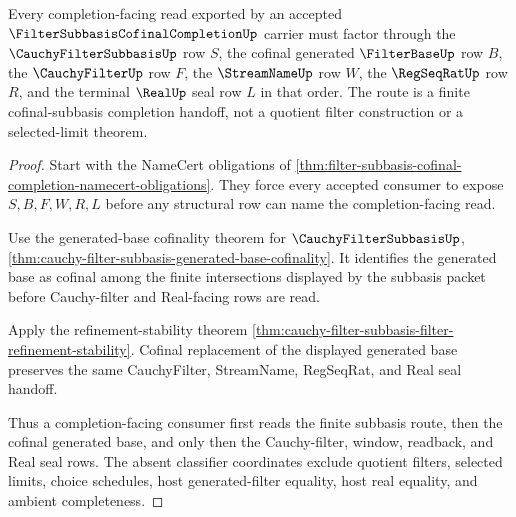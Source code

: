 \begin{theorem}
\label{thm:filter-subbasis-cofinal-completion-route}
Every completion-facing read exported by an accepted $\FilterSubbasisCofinalCompletionUp$ carrier must factor through the $\CauchyFilterSubbasisUp$ row $S$, the cofinal generated $\FilterBaseUp$ row $B$, the $\CauchyFilterUp$ row $F$, the $\StreamNameUp$ row $W$, the $\RegSeqRatUp$ row $R$, and the terminal $\RealUp$ seal row $L$ in that order. The route is a finite cofinal-subbasis completion handoff, not a quotient filter construction or a selected-limit theorem.
\end{theorem}
\begin{proof}
Start with the NameCert obligations of \autoref{thm:filter-subbasis-cofinal-completion-namecert-obligations}. They force every accepted consumer to expose $S,B,F,W,R,L$ before any structural row can name the completion-facing read.

Use the generated-base cofinality theorem for $\CauchyFilterSubbasisUp$, \autoref{thm:cauchy-filter-subbasis-generated-base-cofinality}. It identifies the generated base as cofinal among the finite intersections displayed by the subbasis packet before Cauchy-filter and Real-facing rows are read.

Apply the refinement-stability theorem \autoref{thm:cauchy-filter-subbasis-filter-refinement-stability}. Cofinal replacement of the displayed generated base preserves the same CauchyFilter, StreamName, RegSeqRat, and Real seal handoff.

Thus a completion-facing consumer first reads the finite subbasis route, then the cofinal generated base, and only then the Cauchy-filter, window, readback, and Real seal rows. The absent classifier coordinates exclude quotient filters, selected limits, choice schedules, host generated-filter equality, host real equality, and ambient completeness.
\end{proof}




